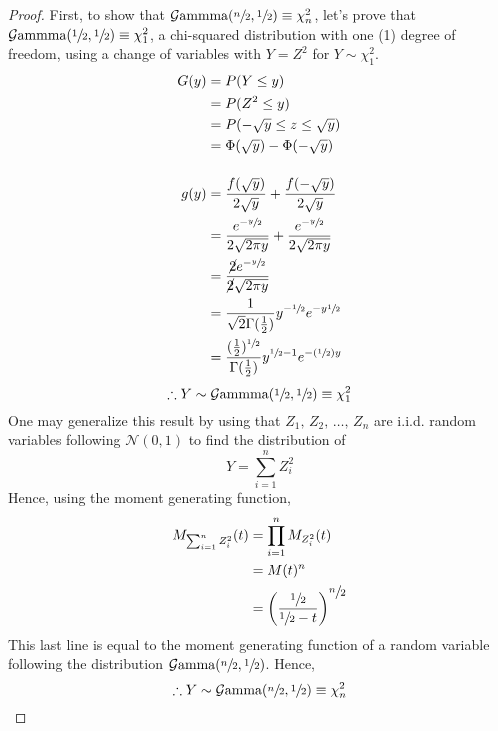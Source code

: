 \documentclass[12pt]{article}
\newcommand{\G}{\mathcal{G}}
\newcommand{\N}{\mathcal{N}}
\begin{document}
\begin{proof}
	First, to show that $\G\text{ammma}(\sfrac{n}{2},\sfrac{1}{2})\equiv\chi^2_n$, let's prove that
	$\G\text{ammma}(\sfrac{1}{2},\sfrac{1}{2})\equiv\chi^2_1$, a chi-squared distribution with one (1) degree of
	freedom, using a change of variables with $Y=Z^2$ for $Y\sim\chi^2_1$.
	\begin{equation*}\label{eq:relation:chisquared:1}
		\begin{split}
			G(y)	&=	P(Y\leq y)\\
					&=	P(Z^2\leq y)\\
					&=	P(-\sqrt{y}\leq z \leq \sqrt{y})\\
					&=	\Phi(\sqrt{y})-\Phi(-\sqrt{y})\\[12pt]
			g(y)	&=	\frac{f(\sqrt{y})}{2\sqrt{y}}+\frac{f(-\sqrt{y})}{2\sqrt{y}}\\
					&=	\frac{e^{-\sfrac{y}{2}}}{2\sqrt{2\pi y}} + \frac{e^{-\sfrac{y}{2}}}{2\sqrt{2\pi y}}\\
					&=	\frac{\cancel{2}e^{-\sfrac{y}{2}}}{\cancel{2}\sqrt{2\pi y}}\\
					&=	\frac{1}{\sqrt{2}\Gamma(\frac{1}{2})}y^{-\sfrac{1}{2}}e^{-y\sfrac{1}{2}}\\
					&=	\frac{(\frac{1}{2})^{\sfrac{1}{2}}}{\Gamma(\frac{1}{2})}y^{\sfrac{1}{2}-1}e^{-(\sfrac{1}{2})y}
			\end{split}
	\end{equation*}
	\begin{equation*}
		\therefore Y\sim\G\text{ammma}(\sfrac{1}{2}, \sfrac{1}{2})\equiv\chi^2_1
	\end{equation*}
	One may generalize this result by using that $Z_1,\,Z_2,\,\ldots,\,Z_n$ are i.i.d. random variables following $\N(0,
	1)$ to find the distribution of
	\begin{equation*}
		Y = \sum^n_{i=1}Z^2_i
	\end{equation*}
	Hence, using the moment generating function,
	\begin{equation*}\label{eq:relation:chisquared:n}
		\begin{split}
			M_{\sum^n_{i=1}Z^2_i}(t)	&=	\prod^n_{i=1}M_{Z^2_i}(t)\\
										&=	M(t)^n\\
										&=	\left(\frac{\sfrac{1}{2}}{\sfrac{1}{2}-t}\right)^{\displaystyle\sfrac{n}{2}}
		\end{split}
	\end{equation*}
	This last line is equal to the moment generating function of a random variable following the distribution
	$\G\text{amma}(\sfrac{n}{2}, \sfrac{1}{2})$. Hence,
	\begin{equation*}
		\therefore Y\sim\G\text{amma}(\sfrac{n}{2}, \sfrac{1}{2})\equiv \chi^2_n
	\end{equation*}
\end{proof}
\end{document}
